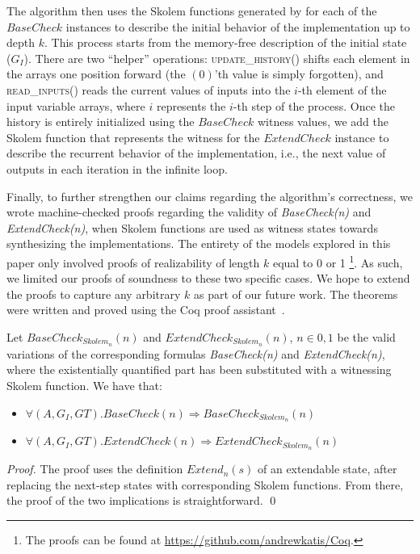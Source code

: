The algorithm then uses the Skolem functions generated by \aeval for each
of the $\mathit{BaseCheck}$ instances to describe the initial behavior of
the implementation up to depth $k$.  This process starts from the memory-free
description of the initial state ($G_I$). 
There are two ``helper'' operations:
\textsc{update\_history()} shifts each element in the arrays one position
forward (the $(0)$'th value is simply forgotten), and \textsc{read\_inputs()} reads the
current values of inputs into the $i$-th element of the input variable arrays,
where $i$ represents the $i$-th step of the process.
Once the history is entirely initialized using the $\mathit{BaseCheck}$ witness values,
we add the Skolem function that represents the witness for the
$\mathit{ExtendCheck}$ instance to describe the recurrent behavior of the implementation, i.e.,
the next value of outputs in each iteration in the infinite loop.

Finally, to further strengthen our claims regarding the algorithm's
correctness, we wrote machine-checked proofs regarding the validity of \textit{BaseCheck(n)} and
\textit{ExtendCheck(n)}, when Skolem functions are used as witness states
towards synthesizing the implementations. The entirety of the models explored in
this paper only involved proofs of realizability of length $k$ equal to 0 or
1%
\footnote{The proofs can be found at \url{https://github.com/andrewkatis/Coq}.}.
As such, we limited our proofs of soundness to these two specific cases. We hope
to extend the proofs to capture any arbitrary $k$ as part of our future work.
The theorems were written and proved using the Coq proof
assistant~\cite{Coqmanual}.

\begin{theorem} Let $BaseCheck_{Skolem_n}(n)$ and
$ExtendCheck_{Skolem_n}(n)$, $n \in {0,1}$ be the valid
variations of the corresponding formulas \textit{BaseCheck(n)} and
\textit{ExtendCheck(n)}, where the existentially quantified part has been substituted
with a witnessing Skolem function. We have that:
\begin{itemize}
\item $\forall (A,G_{I},G{T}). BaseCheck(n) \Rightarrow BaseCheck_{Skolem_n}(n)$
\item $\forall (A,G_{I},G{T}). ExtendCheck(n) \Rightarrow
ExtendCheck_{Skolem_n}(n)$
\end{itemize}
\end{theorem}
\begin{proof}
The proof uses the definition \textit{$Extend_n(s)$} of an extendable state,
after replacing the next-step states with corresponding Skolem functions. From there,
the proof of the two implications is straightforward.
\qed
\end{proof}

